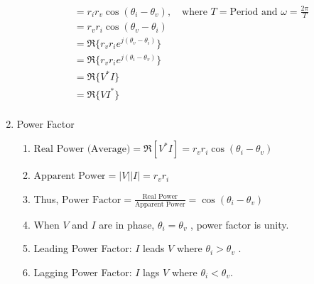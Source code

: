 \documentclass{article}
\begin{document}
\begin{enumerate}
\begin{align*}
        &= r_i r_v \cos(\theta_i - \theta_v), \quad \text{where } T = \text{Period and } \omega = \frac{2\pi}{T} \\
        &= r_v r_i \cos(\theta_v - \theta_i) \\
        &= \Re\{r_v r_i e^{j(\theta_v - \theta_i)}\} \\
        &= \Re\{r_v r_i e^{j(\theta_i - \theta_v)}\} \\
        &= \Re\{V^* I\} \\
        &= \Re\{VI^*\} \\
        \end{align*}
        \item Power Factor
        \begin{enumerate}
            \item $\text{Real Power (Average)} = \Re[V^*I] = r_vr_i\cos(\theta_i-\theta_v)$
            \item  $\displaystyle \text{Apparent Power} = |V||I| = r_vr_i$
            \item Thus, $\displaystyle \text{Power Factor} = \frac{\text{Real Power}}{\text{Apparent Power}} = \cos(\theta_i-\theta_v)$ 
            \item When $V$ and $I$ are in phase, $\theta_i = \theta_v$ , power factor is unity.
            \item Leading Power Factor: $I$ leads $V$ where $\theta_i > \theta_v$ .
            \item Lagging Power Factor: $I$ lags $V$ where $\theta_i < \theta_v$.
        \end{enumerate}
\end{enumerate}
\end{document}
